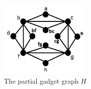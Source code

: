 \begin{figure}[htb]	
\center%
\includegraphics[width=4.5cm]{./img/gadgetBase.png}
\caption{The partial gadget graph $H$}
\label{fig:gadgetBase}
\end{figure}